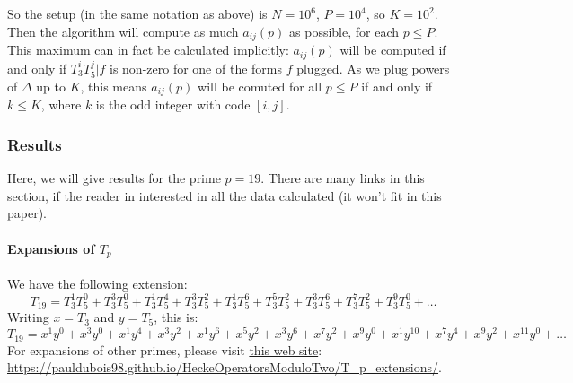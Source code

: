 So the setup (in the same notation as above) is $N=10^6$, $P=10^4$, so $K=10^2$.
Then the algorithm will compute as much $a_{ij}(p)$ as possible, for each $p \leq P$.
This maximum can in fact be calculated implicitly:
$a_{ij}(p)$ will be computed if and only if $T_3^iT_5^j|f$ is non-zero for one of the forms $f$ plugged.
As we plug powers of $\Delta$ up to $K$, this means $a_{ij}(p)$ will be comuted for all $p \leq P$ if and only if $k \leq K$, where $k$ is the odd integer with code $[i,j]$.

\subsubsection{Results}
Here, we will give results for the prime $p=19$.
There are many links in this section, if the reader in interested in all the data calculated (it won't fit in this paper).

\paragraph{Expansions of $T_p$}
We have the following extension:
$$
T_{19} = T_3^1T_5^0 + T_3^3T_5^0 + T_3^1T_5^4 + T_3^3T_5^2 + T_3^1T_5^6 + T_3^5T_5^2 + T_3^3T_5^6 + T_3^7T_5^2 + T_3^9T_5^0 + \dots
$$
Writing $x = T_3$ and $y = T_5$, this is:
$$
T_{19} = x^1y^0 + x^3y^0 + x^1y^4 + x^3y^2 + x^1y^6 + x^5y^2 + x^3y^6 + x^7y^2 + x^9y^0 + x^1y^{10} + x^7y^4 + x^9y^2 + x^{11}y^0 + \dots
$$
For expansions of other primes, please visit \href{https://pauldubois98.github.io/HeckeOperatorsModuloTwo/T_p_extensions/}{this web site}:\\ \url{https://pauldubois98.github.io/HeckeOperatorsModuloTwo/T_p_extensions/}.

